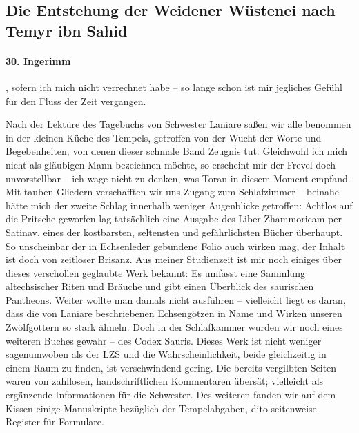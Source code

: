 \subsection{Die Entstehung der Weidener Wüstenei nach Temyr ibn Sahid}

\paragraph{30. Ingerimm}, sofern ich mich nicht verrechnet habe -- so lange schon ist mir jegliches Gefühl für den Fluss der Zeit vergangen.


Nach der Lektüre des Tagebuchs von Schwester Laniare saßen wir alle benommen in der kleinen Küche des Tempels, getroffen von der Wucht der Worte und Begebenheiten, von denen dieser schmale Band Zeugnis tut. Gleichwohl ich mich nicht als gläubigen Mann bezeichnen möchte, so erscheint mir der Frevel doch unvorstellbar -- ich wage nicht zu denken, was Toran in diesem Moment empfand. Mit tauben Gliedern verschafften wir uns Zugang zum Schlafzimmer -- beinahe hätte mich der zweite Schlag innerhalb weniger Augenblicke getroffen: Achtlos auf die Pritsche geworfen lag tatsächlich eine Ausgabe des Liber Zhammoricam per Satinav, eines der kostbarsten, seltensten und gefährlichsten Bücher überhaupt. So unscheinbar der in Echsenleder gebundene Folio auch wirken mag, der Inhalt ist doch von zeitloser Brisanz. Aus meiner Studienzeit ist mir noch einiges über dieses verschollen geglaubte Werk bekannt: Es umfasst eine Sammlung altechsischer Riten und Bräuche und gibt einen Überblick des saurischen Pantheons. Weiter wollte man damals nicht ausführen -- vielleicht liegt es daran, dass die von Laniare beschriebenen Echsengötzen in Name und Wirken unseren Zwölfgöttern so stark ähneln. Doch in der Schlafkammer wurden wir noch eines weiteren Buches gewahr -- des Codex Sauris. Dieses Werk ist nicht weniger sagenumwoben als der LZS und die Wahrscheinlichkeit, beide gleichzeitig in einem Raum zu finden, ist verschwindend gering. Die bereits vergilbten Seiten waren von zahllosen, handschriftlichen Kommentaren übersät; vielleicht als ergänzende Informationen für die Schwester. Des weiteren fanden wir auf dem Kissen einige Manuskripte bezüglich der Tempelabgaben, dito seitenweise Register für Formulare.


